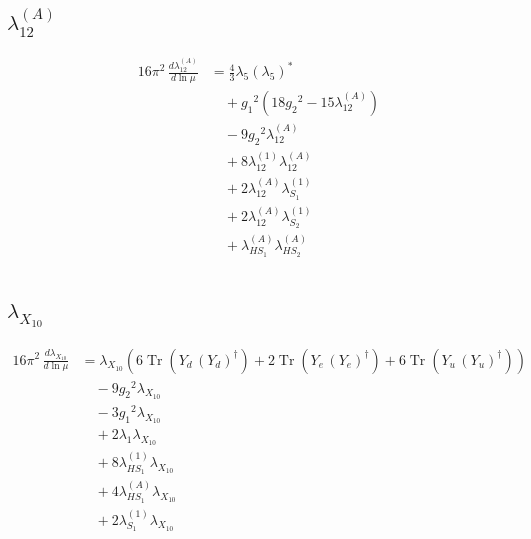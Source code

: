 \documentclass[10pt,a4paper]{article}
\begin{document}
\subsection*{$\lambda_{12}^{(A)}$}
\begin{align*}
16\pi^2\,\frac{d \lambda_{12}^{(A)}}{d\ln\mu} &=\frac{4}{3} {\lambda_5} \left({\lambda_5}\right)^{*} \\
&\quad +{g_1}^2 \left(18 {g_2}^2-15 {\lambda_{12}^{(A)}}\right) \\
&\quad -9 {g_2}^2 {\lambda_{12}^{(A)}} \\
&\quad +8 {\lambda_{12}^{(1)}} {\lambda_{12}^{(A)}} \\
&\quad +2 {\lambda_{12}^{(A)}} {\lambda_{S_1}^{(1)}} \\
&\quad +2 {\lambda_{12}^{(A)}} {\lambda_{S_2}^{(1)}} \\
&\quad +{\lambda_{HS_1}^{(A)}} {\lambda_{HS_2}^{(A)}} \\
\end{align*}
\subsection*{$\lambda_{X_{10}}$}
\begin{align*}
16\pi^2\,\frac{d \lambda_{X_{10}}}{d\ln\mu} &={\lambda_{X_{10}}} (6 \operatorname{Tr}\!\left({Y_d}\,\left({Y_d}\right)^{\dagger}\right)+2 \operatorname{Tr}\!\left({Y_e}\,\left({Y_e}\right)^{\dagger}\right)+6 \operatorname{Tr}\!\left({Y_u}\,\left({Y_u}\right)^{\dagger}\right)) \\
&\quad -9 {g_2}^2 {\lambda_{X_{10}}} \\
&\quad -3 {g_1}^2 {\lambda_{X_{10}}} \\
&\quad +2 {\lambda_1} {\lambda_{X_{10}}} \\
&\quad +8 {\lambda_{HS_1}^{(1)}} {\lambda_{X_{10}}} \\
&\quad +4 {\lambda_{HS_1}^{(A)}} {\lambda_{X_{10}}} \\
&\quad +2 {\lambda_{S_1}^{(1)}} {\lambda_{X_{10}}} \\
\end{align*}
\end{document}
